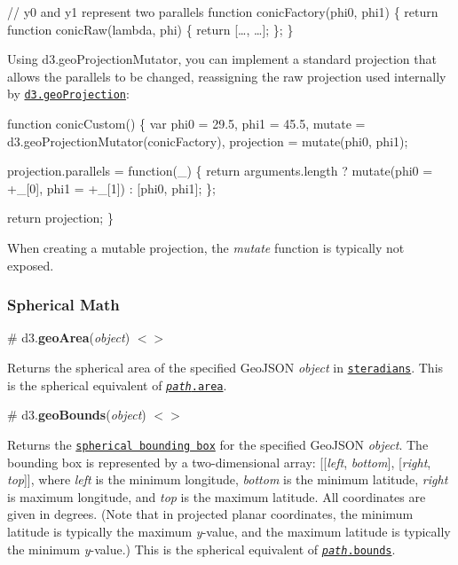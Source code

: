 \begin{DoxyCode}
// y0 and y1 represent two parallels
function conicFactory(phi0, phi1) \{
  return function conicRaw(lambda, phi) \{
    return […, …];
  \};
\}
\end{DoxyCode}


Using d3.\+geo\+Projection\+Mutator, you can implement a standard projection that allows the parallels to be changed, reassigning the raw projection used internally by \href{#geoProjection}{\tt d3.\+geo\+Projection}\+:


\begin{DoxyCode}
function conicCustom() \{
  var phi0 = 29.5,
      phi1 = 45.5,
      mutate = d3.geoProjectionMutator(conicFactory),
      projection = mutate(phi0, phi1);

  projection.parallels = function(\_) \{
    return arguments.length ? mutate(phi0 = +\_[0], phi1 = +\_[1]) : [phi0, phi1];
  \};

  return projection;
\}
\end{DoxyCode}


When creating a mutable projection, the {\itshape mutate} function is typically not exposed.

\subsubsection*{Spherical Math}

\label{_geoArea}%
\# d3.{\bfseries geo\+Area}({\itshape object}) \href{https://github.com/d3/d3-geo/blob/master/src/area.js}{\tt $<$$>$}

Returns the spherical area of the specified Geo\+J\+S\+ON {\itshape object} in \href{http://mathworld.wolfram.com/Steradian.html}{\tt steradians}. This is the spherical equivalent of \href{#path_area}{\tt {\itshape path}.area}.

\label{_geoBounds}%
\# d3.{\bfseries geo\+Bounds}({\itshape object}) \href{https://github.com/d3/d3-geo/blob/master/src/bounds.js}{\tt $<$$>$}

Returns the \href{https://www.jasondavies.com/maps/bounds/}{\tt spherical bounding box} for the specified Geo\+J\+S\+ON {\itshape object}. The bounding box is represented by a two-\/dimensional array\+: \mbox{[}\mbox{[}{\itshape left}, {\itshape bottom}\mbox{]}, \mbox{[}{\itshape right}, {\itshape top}\mbox{]}\mbox{]}, where {\itshape left} is the minimum longitude, {\itshape bottom} is the minimum latitude, {\itshape right} is maximum longitude, and {\itshape top} is the maximum latitude. All coordinates are given in degrees. (Note that in projected planar coordinates, the minimum latitude is typically the maximum {\itshape y}-\/value, and the maximum latitude is typically the minimum {\itshape y}-\/value.) This is the spherical equivalent of \href{#path_bounds}{\tt {\itshape path}.bounds}.

